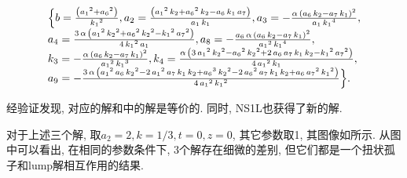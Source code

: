 \begin{eqnarray}
\renewcommand{\arraystretch}{1.2}
\begin{array}{l}
\dbrace{ 
b=\frac{\left( {{{a}_{1}}}^{2}+{{{a}_{6}}}^{2}\right) }{{{{k}_{1}}}^{2}},
{{a}_{2}}=\frac{\left( {{{a}_{1}}}^{2}\,{{k}_{2}}+{{{a}_{6}}}^{2}\,{{k}_{2}}-{{a}_{6}}\,{{k}_{1}}\,{{a}_{7}}\right) }{{{a}_{1}}\,{{k}_{1}}},
{{a}_{3}}=-\frac{\alpha\,\left( {{a}_{6}}\,{{k}_{2}}-{{a}_{7}}\,{{k}_{1}}\right) ^{2}}{{{a}_{1}}\,{{{k}_{1}}}^{4}},\\
{{a}_{4}}=\frac{3\,\alpha\,\left( {{{a}_{1}}}^{2}\,{{{k}_{2}}}^{2}+{{{a}_{6}}}^{2}\,{{{k}_{2}}}^{2}-{{{k}_{1}}}^{2}\,{{{a}_{7}}}^{2}\right) }{4\,{{{k}_{1}}}^{2}\,{{a}_{1}}},
{{a}_{8}}=-\frac{{{a}_{6}}\,\alpha\,\left( {{a}_{6}}\,{{k}_{2}}-{{a}_{7}}\,{{k}_{1}}\right) ^{2}}{{{{a}_{1}}}^{2}\,{{{k}_{1}}}^{4}},\\
{{k}_{3}}=-\frac{\alpha\,\left( {{a}_{6}}\,{{k}_{2}}-{{a}_{7}}\,{{k}_{1}}\right) ^{2}}{{{{a}_{1}}}^{2}\,{{{k}_{1}}}^{3}},
{{k}_{4}}=\frac{\alpha\,\left( 3\,{{{a}_{1}}}^{2}\,{{{k}_{2}}}^{2}-{{{a}_{6}}}^{2}\,{{{k}_{2}}}^{2}+2\,{{a}_{6}}\,{{a}_{7}}\,{{k}_{1}}\,{{k}_{2}}-{{{k}_{1}}}^{2}\,{{{a}_{7}}}^{2}\right) }{4\,{{{a}_{1}}}^{2}\,{{k}_{1}}},\\
{{a}_{9}}=-\frac{3\,\alpha\,\left( {{{a}_{1}}}^{2}\,{{a}_{6}}\,{{{k}_{2}}}^{2}-2\,{{{a}_{1}}}^{2}\,{{a}_{7}}\,{{k}_{1}}\,{{k}_{2}}+{{{a}_{6}}}^{3}\,{{{k}_{2}}}^{2}-2\,{{{a}_{6}}}^{2}\,{{a}_{7}}\,{{k}_{1}}\,{{k}_{2}}+{{a}_{6}}\,{{{a}_{7}}}^{2}\,{{{k}_{1}}}^{2}\right) }{4\,{{{a}_{1}}}^{2}\,{{{k}_{1}}}^{2}} 
}.
\end{array} \label{1S1L-1}
\end{eqnarray}

经验证发现, 对应的解和中的解是等价的. 同时, NS1L也获得了新的解.

对于上述三个解, 取$a_2=2,k=1/3,t=0,z=0$, 其它参数取1, 其图像如所示. 从图中可以看出, 在相同的参数条件下, 3个解存在细微的差别, 但它们都是一个扭状孤子和lump解相互作用的结果. 

